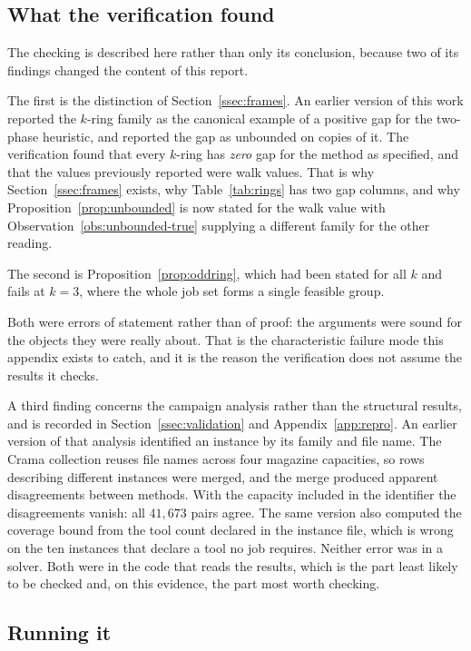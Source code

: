 \subsection{What the verification found}\label{ssec:verify-found}

The checking is described here rather than only its conclusion, because two of its
findings changed the content of this report.

The first is the distinction of Section~\ref{ssec:frames}. An earlier version of this
work reported the $k$-ring family as the canonical example of a positive gap for the
two-phase heuristic, and reported the gap as unbounded on copies of it. The
verification found that every $k$-ring has \emph{zero} gap for the method as specified,
and that the values previously reported were walk values. That is why
Section~\ref{ssec:frames} exists, why Table~\ref{tab:rings} has two gap columns, and
why Proposition~\ref{prop:unbounded} is now stated for the walk value with
Observation~\ref{obs:unbounded-true} supplying a different family for the other
reading.

The second is Proposition~\ref{prop:oddring}, which had been stated for all $k$ and
fails at $k=3$, where the whole job set forms a single feasible group.

Both were errors of statement rather than of proof: the arguments were sound for the
objects they were really about. That is the characteristic failure mode this appendix
exists to catch, and it is the reason the verification does not assume the results it
checks.

A third finding concerns the campaign analysis rather than the structural results, and
is recorded in Section~\ref{ssec:validation} and Appendix~\ref{app:repro}. An earlier
version of that analysis identified an instance by its family and file name. The Crama
collection reuses file names across four magazine capacities, so rows describing
different instances were merged, and the merge produced apparent disagreements between
methods. With the capacity included in the identifier the disagreements vanish: all
$41{,}673$ pairs agree. The same version also computed the coverage bound from the tool
count declared in the instance file, which is wrong on the ten instances that declare a
tool no job requires. Neither error was in a solver. Both were in the code that reads
the results, which is the part least likely to be checked and, on this evidence, the
part most worth checking.

\subsection{Running it}\label{ssec:verify-running}

